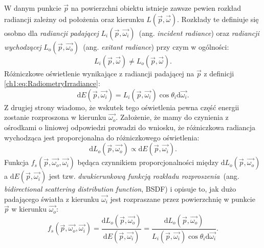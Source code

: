 \begin{itemize}
W danym punkcie $\vec{p}$ na powierzchni obiektu istnieje zawsze pewien rozkład radiancji zależny od położenia oraz kierunku $L(\vec{p}, \vec{\omega})$. Rozkłady te definiuje się osobno dla \textit{radiancji padającej} $L_i(\vec{p}, \vec{\omega_i})$~(ang. \textit{incident radiance}) oraz \textit{radiancji wychodzącej} $L_o(\vec{p}, \vec{\omega_o})$~(ang. \textit{exitant radiance}) przy czym w ogólności:
\begin{equation}
L_i(\vec{p}, \vec{\omega})\neq L_o(\vec{p}, \vec{\omega}).
\end{equation}
Różniczkowe oświetlenie wynikające z radiancji padającej na $\vec{p}$ z definicji \eqref{ch1:eq:RadiometryIrradiance}:
\begin{equation}
\mathrm{d}E(\vec{p},\vec{\omega_i})=L_i(\vec{p}, \vec{\omega_i})\cos\theta_i\mathrm{d}\vec{\omega_i}.
\end{equation}
Z drugiej strony wiadomo, że wskutek tego oświetlenia pewna część energii zostanie rozproszona w kierunku $\vec{\omega_o}$. Założenie, że mamy do czynienia z ośrodkami o liniowej odpowiedzi prowadzi do wniosku, że różniczkowa radiancja wychodząca jest proporcjonalna do różniczkowego oświetlenia:
\begin{equation}
\mathrm{d}L_o(\vec{p}, \vec{\omega_o}) \propto \mathrm{d}E(\vec{p},\vec{\omega_i}).
\end{equation}
Funkcja $f_s(\vec{p}, \vec{\omega_o}, \vec{\omega_i})$ będąca czynnikiem proporcjonalności między $\mathrm{d}L_o(\vec{p}, \vec{\omega_o})$ a $\mathrm{d}E(\vec{p},\vec{\omega_i})$ jest tzw. \textit{dwukierunkową funkcją rozkładu rozproszenia}~(ang. \textit{bidirectional scattering distribution function}, BSDF) i opisuje to, jak dużo padającego światła z kierunku $\vec{\omega_i}$ jest rozpraszane przez powierzchnię w punkcie $\vec{p}$ w kierunku $\vec{\omega_o}$:
\begin{equation}
f_s(\vec{p}, \vec{\omega_o}, \vec{\omega_i}) = \frac{\mathrm{d}L_o(\vec{p}, \vec{\omega_o})}{\mathrm{d}E(\vec{p},\vec{\omega_i})} = \frac{\mathrm{d}L_o(\vec{p}, \vec{\omega_o})}{L_i(\vec{p}, \vec{\omega_i})\cos\theta_i\mathrm{d}\vec{\omega_i}}.
\label{ch1:eq:bsdfGeneral}
\end{equation}

\end{itemize}
